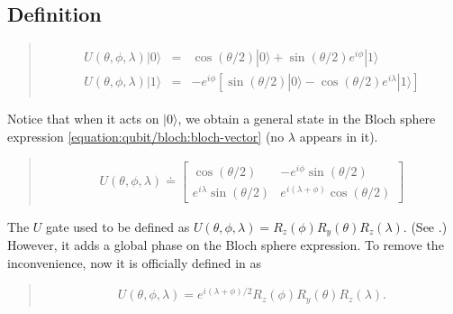 \documentclass[letterpaper,10pt,english]{jupyterBook}
\begin{document}
\subsection{Definition}
\label{\detokenize{q1gates/u:definition}}
\sphinxAtStartPar
{}
\begin{quote}
\begin{equation*}
\begin{split}
\begin{eqnarray}
U(\theta,\phi,\lambda) |0\rangle &=& \cos(\theta/2) |0\rangle + \sin(\theta/2) e^{i \phi} |1\rangle \\
U(\theta,\phi,\lambda) |1\rangle &=& - e^{i \phi} \left[\sin(\theta/2) |0\rangle  - \cos(\theta/2) e^{i \lambda}|1\rangle\right]
\end{eqnarray}
\end{split}
\end{equation*}\end{quote}

\sphinxAtStartPar
Notice that when it acts on \(|0\rangle\), we obtain a general state in the Bloch sphere expression  \eqref{equation:qubit/bloch:bloch-vector}  (no \(\lambda\) appears in it).

\sphinxAtStartPar
{}
\begin{quote}
\begin{equation*}
\begin{split}
U(\theta,\phi,\lambda) \doteq \begin{bmatrix} \cos(\theta/2) & - e^{i \phi} \sin(\theta/2) \\ e^{i \lambda} \sin(\theta/2) & e^{i (\lambda+\phi)} \cos(\theta/2)\end{bmatrix}
\end{split}
\end{equation*}\end{quote}

\sphinxAtStartPar
{}

\sphinxAtStartPar
The \(U\) gate used to be defined as \(U(\theta,\phi,\lambda)=R_z(\phi) R_y(\theta) R_z(\lambda)\). (See .)  However, it adds a global phase on the Bloch sphere expression. To remove the inconvenience, now it is officially defined in  as
\begin{quote}
\begin{equation*}
\begin{split}
U(\theta,\phi,\lambda) = e^{i (\lambda+\phi)/2} R_z(\phi) R_y(\theta) R_z(\lambda) .
\end{split}
\end{equation*}\end{quote}
\end{document}
